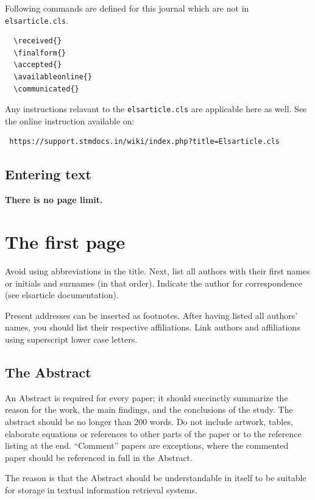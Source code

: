 \documentclass[times,onecolumn,final,longtitle]{elsarticle}
\begin{document}
Following commands are defined for this journal which are not in
\verb+elsarticle.cls+.
\begin{verbatim}
  \received{}
  \finalform{}
  \accepted{}
  \availableonline{}
  \communicated{}
\end{verbatim}

Any instructions relavant to the \verb+elsarticle.cls+ are applicable
here as well. See the online instruction available on:
\begin{verbatim}
 https://support.stmdocs.in/wiki/index.php?title=Elsarticle.cls 
\end{verbatim}

\subsection{Entering text}
\textcolor{newcolor}{\bf There is no page limit.}

\section{The first page}
Avoid using abbreviations in the title. Next, list all authors with
their first names or initials and surnames (in that order). Indicate
the author for correspondence (see elsarticle documentation).

Present addresses can be inserted as footnotes. After having listed all
authors' names, you should list their respective affiliations. Link
authors and affiliations using superscript lower case letters.

\subsection{The Abstract}
An Abstract is required for every paper; it should succinctly summarize
the reason for the work, the main findings, and the conclusions of the
study. The abstract should be no longer than 200 words. Do not include
artwork, tables, elaborate equations or references to other parts of
the paper or to the reference listing at the end. ``Comment'' papers
are exceptions, where the commented paper should be referenced in full
in the Abstract.

The reason is that the Abstract should be understandable in itself to
be suitable for storage in textual information retrieval systems.
\end{document}
